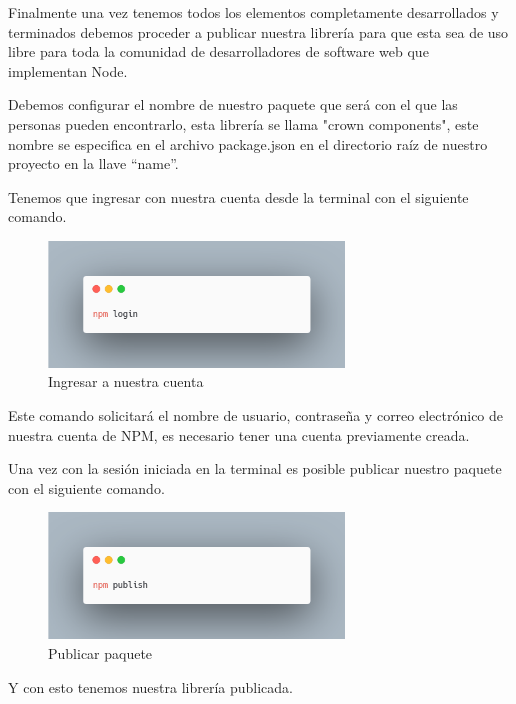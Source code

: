 Finalmente una vez tenemos todos los elementos completamente desarrollados y terminados debemos proceder a publicar nuestra librería para que esta sea de uso libre para toda la comunidad de desarrolladores de software web que implementan Node.

Debemos configurar el nombre de nuestro paquete que será con el que las personas pueden encontrarlo, esta librería se llama "crown components", este nombre se especifica en el archivo package.json en el directorio raíz de nuestro proyecto en la llave “name”.

Tenemos que ingresar con nuestra cuenta desde la terminal con el siguiente comando.
  \newline
    \begin{figure}[H]
    \centering
    \includegraphics[width=0.7\textwidth]{./Imagenes/8.39.png}
    \caption[ingresar a nuestra cuenta]{Ingresar a nuestra cuenta}
    \end{figure}
    
    Este comando solicitará el nombre de usuario, contraseña y correo electrónico de nuestra cuenta de NPM, es necesario tener una cuenta previamente creada.

Una vez con la sesión iniciada en la terminal es posible publicar nuestro paquete con el siguiente comando.
  \newline
    \begin{figure}[H]
    \centering
    \includegraphics[width=0.7\textwidth]{./Imagenes/8.40.png}
    \caption[Publicar paquete]{Publicar paquete}
    \end{figure}
        Y con esto tenemos nuestra librería publicada.
    \clearpage
    

